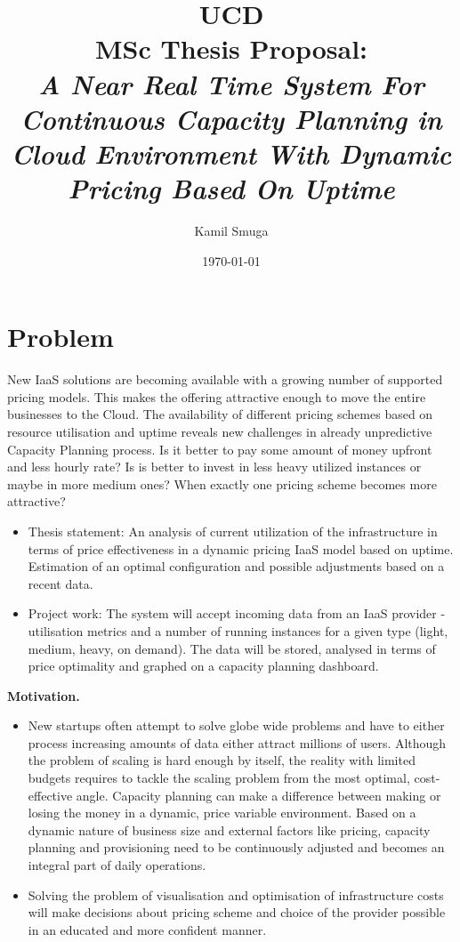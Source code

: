 \documentclass[11pt]{artikel3}
\title{UCD\\MSc Thesis Proposal:\\\emph{A Near Real Time System For Continuous Capacity Planning in Cloud Environment With Dynamic Pricing Based On Uptime}}
\author{Kamil Smuga}
\date{\today}
\begin{document}
\maketitle

\section{Problem}

New IaaS solutions are becoming available with a growing number of supported pricing models. This makes the offering attractive enough to move the entire businesses to the Cloud. The availability of different pricing schemes based on resource utilisation and uptime reveals new challenges in already unpredictive Capacity Planning process. Is it better to pay some amount of money upfront and less hourly rate? Is is better to invest in less heavy utilized instances or maybe in more medium ones? When exactly one pricing scheme becomes more attractive?

\begin{itemize}
  \item Thesis statement: An analysis of current utilization of the infrastructure in terms of price effectiveness in a dynamic pricing IaaS model based on uptime. Estimation of an optimal configuration and possible adjustments based on a recent data.
  \item Project work: The system will accept incoming data from an IaaS provider - utilisation metrics and a number of running instances for a given type (light, medium, heavy, on demand). The data will be stored, analysed in terms of price optimality and graphed on a capacity planning dashboard.  
\end{itemize}

{\bf Motivation.}
\begin{itemize}
  \item New startups often attempt to solve globe wide problems and have to either process increasing amounts of data either attract millions of users. Although the problem of scaling is hard enough by itself, the reality with limited budgets requires to tackle the scaling problem from the most optimal, cost-effective angle. Capacity planning can make a difference between making or losing the money in a dynamic, price variable environment. Based on a dynamic nature of business size and external factors like pricing, capacity planning and provisioning need to be continuously adjusted and becomes an integral part of daily operations.
  \item Solving the problem of visualisation and optimisation of infrastructure costs will make decisions about pricing scheme and choice of the provider possible in an educated and more confident manner.
  
\end{itemize}
\end{document}
